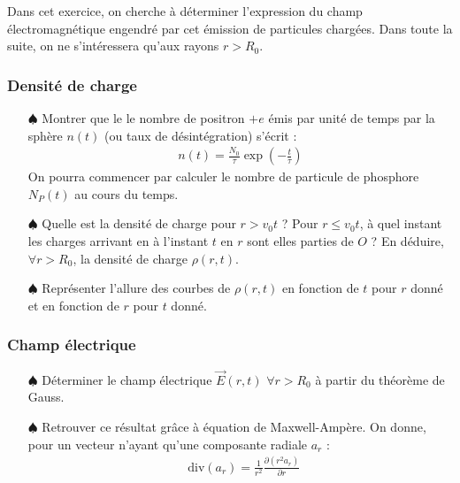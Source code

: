 \documentclass{report}
\newcommand*\diver{\mathop{}\!\mathrm{div}}
\begin{document}
Dans cet exercice, on cherche à déterminer l'expression du champ électromagnétique engendré par cet émission de particules chargées. Dans toute la suite, on ne s'intéressera qu'aux rayons $r>R_0$.

\subsubsection*{Densité de charge}

\begin{itemize}

	\item[$\spadesuit$] Montrer que le le nombre de positron $+e$ émis par unité de temps par la sphère $n(t)$ (ou taux de désintégration) s'écrit : 
\begin{align*}
	n(t)=\frac{N_0}{\tau}\exp\left( -\frac{t}{\tau}\right) 
\end{align*}
On pourra commencer par calculer le nombre de particule de phosphore $N_P(t)$ au cours du temps. 
	
	\item[$\spadesuit$] Quelle est la densité de charge pour $r>v_0t$ ? Pour $r\leq v_0t$, à quel instant les charges arrivant en à l'instant $t$ en $r$ sont elles parties de $O$ ? En déduire, $\forall r>R_0$, la densité de charge $\rho(r,t)$.
	
	\item[$\spadesuit$] Représenter l'allure des courbes de $\rho(r,t)$ en fonction de $t$ pour $r$ donné et en fonction de $r$ pour $t$ donné.
	
\end{itemize}

\subsubsection*{Champ électrique}

\begin{itemize}

	\item[$\spadesuit$] Déterminer le champ électrique $\vec{E}(r,t)$ $\forall r>R_0$ à partir du théorème de Gauss.
	
	\item[$\spadesuit$] Retrouver ce résultat grâce à équation de Maxwell-Ampère. On donne, pour un vecteur n'ayant qu'une composante radiale $a_r$ : 
	\begin{align*}
		\diver(a_r)=\frac{1}{r^2}\frac{\partial (r^2a_r)}{\partial r}
	\end{align*}
	
\end{itemize}
\end{document}
